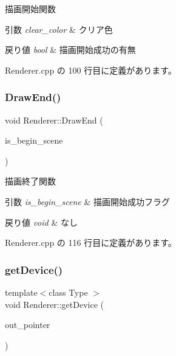 描画開始関数 


\begin{DoxyParams}{引数}
{\em clear\+\_\+color} & クリア色 \\
\hline
\end{DoxyParams}

\begin{DoxyRetVals}{戻り値}
{\em bool} & 描画開始成功の有無 \\
\hline
\end{DoxyRetVals}


 Renderer.\+cpp の 100 行目に定義があります。

\mbox{\label{class_renderer_a0393849bd4178a33861780bf07b0deee}} 
\subsubsection{\texorpdfstring{Draw\+End()}{DrawEnd()}}
{\footnotesize\ttfamily void Renderer\+::\+Draw\+End (\begin{DoxyParamCaption}\item[{bool}]{is\+\_\+begin\+\_\+scene }\end{DoxyParamCaption})}



描画終了関数 


\begin{DoxyParams}{引数}
{\em is\+\_\+begin\+\_\+scene} & 描画開始成功フラグ \\
\hline
\end{DoxyParams}

\begin{DoxyRetVals}{戻り値}
{\em void} & なし \\
\hline
\end{DoxyRetVals}


 Renderer.\+cpp の 116 行目に定義があります。

\mbox{\label{class_renderer_a0f82c27d785abaee2d8014ad56eddeba}} 
\subsubsection{\texorpdfstring{get\+Device()}{getDevice()}}
{\footnotesize\ttfamily template$<$class Type $>$ \\
void Renderer\+::get\+Device (\begin{DoxyParamCaption}\item[{Type $\ast$$\ast$}]{out\+\_\+pointer }\end{DoxyParamCaption})\hspace{0.3cm}{\ttfamily [inline]}}



